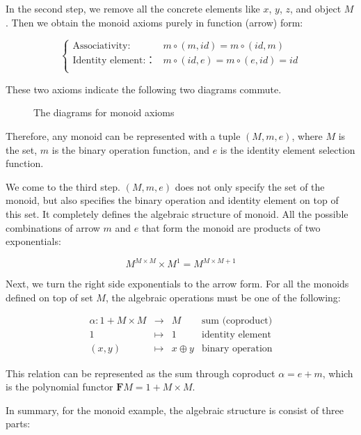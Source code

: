 \documentclass{article}
\begin{document}
\begin{example}
In the second step, we remove all the concrete elements like $x$, $y$, $z$, and object $M$. Then we obtain the monoid axioms purely in function (arrow) form:

\[
\begin{cases}
\text{Associativity:} & m \circ (m, id) = m \circ (id, m) \\
\text{Identity element:：} & m \circ (id, e) = m \circ (e, id) = id \\
\end{cases}
\]

These two axioms indicate the following two diagrams commute.

\begin{figure}[htbp]
\centering
{}
\quad
{}
\caption{The diagrams for monoid axioms}
\end{figure}

Therefore, any monoid can be represented with a tuple $(M, m , e)$, where $M$ is the set, $m$ is the binary operation function, and $e$ is the identity element selection function.

We come to the third step. $(M, m, e)$ does not only specify the set of the monoid, but also specifies the binary operation and identity element on top of this set. It completely defines the algebraic structure of monoid. All the possible combinations of arrow $m$ and $e$ that form the monoid are products of two exponentials:

\[
M^{M \times M} \times M^1 = M^{M \times M + 1}
\]

Next, we turn the right side exponentials to the arrow form. For all the monoids defined on top of set $M$, the algebraic operations must be one of the following:

\[
\begin{array}{rcll}
\alpha : 1 + M \times M & \longrightarrow & M & \text{sum (coproduct)}\\
1 & \longmapsto & 1 & \text{identity element}  \\
(x, y) & \longmapsto & x \oplus y & \text{binary operation}
\end{array}
\]

This relation can be represented as the sum through coproduct $\alpha = e + m$, which is the polynomial functor $\mathbf{F} M = 1 + M \times M$.

In summary, for the monoid example, the algebraic structure is consist of three parts:


\end{example}
\end{document}
